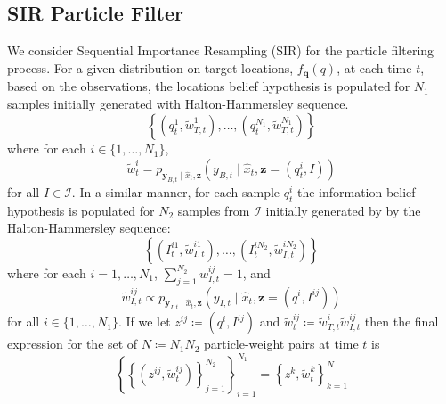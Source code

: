 \documentclass[journal]{IEEEtran}
\begin{document}
\subsection{SIR Particle Filter}
We consider Sequential Importance Resampling (SIR) \cite{arulampalam2002tutorial} for the particle filtering process.
For a given distribution on target locations, $f_{\bm{q}}(q)$,
at each time $t$, based on the observations, the locations belief hypothesis is populated for 
 $N_1$ samples initially generated with Halton-Hammersley sequence.
\[
\left\{ \left( q_t^{1},\widetilde{w}_{T,t}^{1}\right),\dots,\left(q_t^{N_1},\widetilde{w}_{T,t}^{N_1}\right)\right\}
\]
where for each $i \in \lbrace 1,\dots,N_1 \rbrace$,
\[
\widetilde{w}_t^{i} =
p_{\bm{y}_{B,t} \mid
	\hat{x}_{t},\bm{z}}\left(
y_{B,t} \mid
\hat{x}_{t},\bm{z}=(q_t^i,I)\right) 
\]
for all $I \in \mathcal{I}$. In a similar manner, for each sample $q_t^{i}$
the information belief hypothesis is populated for $N_2$ samples from $\mathcal{I}$ initially generated by by the Halton-Hammersley sequence:
\[
\left\{
\left(
I_t^{i1},\widetilde{w}_{I,t}^{i1}\right),\dots,
\left(I_t^{iN_2},\widetilde{w}_{I,t}^{iN_2}\right)
\right\}
\]
where for each $i = 1,\dots,N_1$, $\sum_{j=1}^{N_2} w_{I,t}^{ij} = 1$, 
and 
\[
\widetilde{w}_{I,t}^{ij} \propto
p_{\bm{y}_{I,t} \mid
	\hat{x}_{t},\bm{z}}\left(
y_{I,t} \mid
\hat{x}_{t},\bm{z}=(q^i,I^{ij})\right)
\]
for all $i \in \lbrace 1,\dots,N_1 \rbrace$.
If we let $z^{ij} \coloneqq (q^{i},I^{ij})$ and $\widetilde{w}_t^{ij} \coloneqq \widetilde{w}_{T,t}^{i}\widetilde{w}_{I,t}^{ij}$ then the final expression for the set of $N\coloneqq N_1N_2$ particle-weight pairs at time $t$ is
\[
\left\{
\left\{
(z^{ij},\widetilde{w}_t^{ij})
\right\}_{j=1}^{N_2}
\right\}_{i=1}^{N_1}
= \left\{
z^k,\widetilde{w}_t^k
\right\}_{k=1}^N
\]
\end{document}
